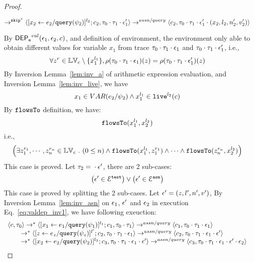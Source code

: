 {\begin{proof}
\begin{subproof}[Subproof]
\[  \rightarrow^{\mathtt{skip}^*} 
  \langle [\mathrel{ {x}_2 \leftarrow e_2 / {\tt query}(\psi_2) }]^{l_2} ; {c}_2, \mathtt{\tau}_0 \cdot \mathtt{\tau}_1 \cdot \mathtt{\epsilon}_1' \rangle 
  \rightarrow^{assn/query} 
  \langle {c}_2,  \mathtt{\tau}_0 \cdot \mathtt{\tau}_1 \cdot \mathtt{\epsilon}_1' \cdot (x_2, l_2, n_2', v_2') \rangle 
 \]
\end{subproof}
%
By $\mathsf{DEP_{\mathtt{e}}}^{val}(\mathtt{\epsilon}_1, \mathtt{\epsilon}_2, c)$, and definition of environment, 
the environment only able to obtain different values for variable $x_1$ 
from trace $\mathtt{\tau}_0 \cdot \mathtt{\tau}_1 \cdot \mathtt{\epsilon}_1$ and 
$\mathtt{\tau}_0 \cdot \mathtt{\tau}_1 \cdot \mathtt{\epsilon}_1'$, i.e.,
\[
  \forall z^r \in \mathbb{LV}_c \setminus \{x_1^{l_1}\} ,
  \rho(\mathtt{\tau}_0 \cdot \mathtt{\tau}_1 \cdot \mathtt{\epsilon}_1) (z) =  
  \rho(\mathtt{\tau}_0 \cdot \mathtt{\tau}_1 \cdot \mathtt{\epsilon}_1') (z)
\]
%
By {Inversion Lemma~\ref{lem:inv_a}} of arithmetic expression evaluation, and Inversion Lemma~\ref{lem:inv_live}, we have 
\[
  x_1 \in VAR(e_2 / \psi_2) 
  \land x_1^{l_1} \in \mathtt{live}^{l_2}(c)
\]
%
By $\mathtt{flowsTo}$ definition, we have:
%
\[
\mathtt{flowsTo}(x_1^{l_1}, {x}_2^{l_2})
\]
i.e.,
%
\[
\Big(\exists z_1^{r_1}, \cdots, z_n^{r_n} \in \mathbb{LV}_{{c}} ~.~ (0 \leq n )
 \land \mathtt{flowsTo}(x_1^{l_1}, z_1^{r_1}) \land \cdots \land \mathtt{flowsTo}(z_n^{r_n}, {x}_2^{l_2}) \Big)
 \]
%
This case is proved.
%
%
Let $\mathtt{\tau}_2 = {} \cdot {} \mathtt{\epsilon}'$, there are 2 sub-cases: 
%
 \[
 \big(\mathtt{\epsilon}' \in \mathcal{E}^{\mathtt{{test}}}\big) \lor \big(\mathtt{\epsilon}' \in \mathcal{E}^{\mathtt{{asn}}}\big)
 \]
%
This case is proved by splitting the 2 sub-cases.
%
%
Let $\mathtt{\epsilon}' = (z, l', n', v')$, 
%
By Inversion Lemma~\ref{lem:inv_asn} on $\mathtt{\epsilon}_1$, $\mathtt{\epsilon}'$ and $\mathtt{\epsilon}_2$ in execution Eq.~\ref{eq:valdep_inv1}, we have following exeuction:
\begin{equation}
\label{eq:m1asn_inv1}
  \begin{array}{l}   
\langle {c}, \mathtt{\tau}_0 \rangle \rightarrow^{*} 
\langle [\mathrel{ {x}_1 \leftarrow e_1 / {\tt query}(\psi_1) }]^{l_1} ; {c}_1, \mathtt{\tau}_0 \cdot \mathtt{\tau}_1 \rangle  \rightarrow^{assn/query}
 \langle c_1, \mathtt{\tau}_0 \cdot \mathtt{\tau}_1 \cdot \mathtt{\epsilon}_1 \rangle \\
  \qquad \rightarrow^{*} 
  \langle [\mathrel{ z \leftarrow e_z / {\tt query}(\psi_z) }]^{l'};{c}_2, 
  \mathtt{\tau}_0 \cdot \mathtt{\tau}_1 \cdot \mathtt{\epsilon}_1 \rangle 
  \rightarrow^{assn/query} 
  \langle {c}_2,  \mathtt{\tau}_0 \cdot \mathtt{\tau}_1 \cdot \mathtt{\epsilon}_1 \cdot \mathtt{\epsilon}' \rangle  \\
  \qquad \rightarrow^{*} 
  \langle [\mathrel{ {x}_2 \leftarrow e_2 / {\tt query}(\psi_2) }]^{l_2};{c}_3, 
  \mathtt{\tau}_0 \cdot \mathtt{\tau}_1 \cdot \mathtt{\epsilon}_1\cdot \mathtt{\epsilon}' \rangle 
  \rightarrow^{assn/query} 
  \langle {c}_3,  \mathtt{\tau}_0 \cdot \mathtt{\tau}_1 \cdot \mathtt{\epsilon}_1 \cdot \mathtt{\epsilon}' \cdot \mathtt{\epsilon}_2 \rangle 

\end{array}
\end{equation}
\end{proof}}
